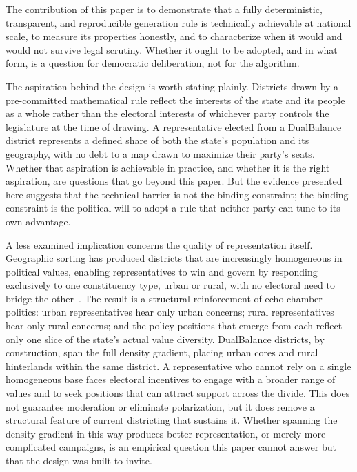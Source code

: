 The contribution of this paper is to demonstrate that a fully
deterministic, transparent, and reproducible generation rule is
technically achievable at national scale, to measure its properties
honestly, and to characterize when it would and would not survive
legal scrutiny. Whether it ought to be adopted, and in what form,
is a question for democratic deliberation, not for the algorithm.

The aspiration behind the design is worth stating plainly. Districts
drawn by a pre-committed mathematical rule reflect the interests of
the state and its people as a whole rather than the electoral
interests of whichever party controls the legislature at the time
of drawing. A representative elected from a DualBalance district
represents a defined share of both the state's population and its
geography, with no debt to a map drawn to maximize their party's
seats. Whether that aspiration is achievable in practice, and
whether it is the right aspiration, are questions that go beyond
this paper. But the evidence presented here suggests that the
technical barrier is not the binding constraint; the binding
constraint is the political will to adopt a rule that neither party
can tune to its own advantage.

A less examined implication concerns the quality of representation
itself. Geographic sorting has produced districts that are
increasingly homogeneous in political values, enabling
representatives to win and govern by responding exclusively to one
constituency type, urban or rural, with no electoral need to
bridge the other~\cite{bishop2008,rodden2019}. The result is a
structural reinforcement of echo-chamber politics: urban
representatives hear only urban concerns; rural representatives
hear only rural concerns; and the policy positions that emerge
from each reflect only one slice of the state's actual value
diversity. DualBalance districts, by construction, span the full
density gradient, placing urban cores and rural hinterlands within
the same district. A representative who cannot rely on a single
homogeneous base faces electoral incentives to engage with a
broader range of values and to seek positions that can attract
support across the divide. This does not guarantee moderation or
eliminate polarization, but it does remove a structural feature of
current districting that sustains it. Whether spanning the density
gradient in this way produces better representation, or merely more
complicated campaigns, is an empirical question this paper cannot
answer but that the design was built to invite.
